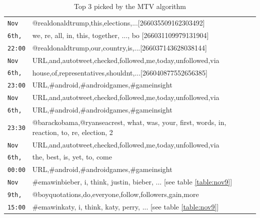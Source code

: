 \documentclass{sig-alternate}
\begin{document}
 
 \begin{table}
 \begin{center}
\small
\def\arraystretch{1.1}
\begin{tabular}{|p{.6cm}|p{7.5cm}|}

\hline

\texttt{Nov}
& @realdonaldtrump,this,elections,...[266035509162303492] \\\cline{2-2} %
\texttt{6th,}
&we, re, all, in, this, together, ..., bo [266031109979131904]  \\\cline{2-2} %
\texttt{22:00} & @realdonaldtrump,our,country,is,...[266037143628038144] \\\hline %




\texttt{Nov}
&URL,and,autotweet,checked,followed,me,today,unfollowed,via \\\cline{2-2}
\texttt{6th,}
&house,of,representatives,shouldnt,...[266040877552656385]  \\\cline{2-2} %
\texttt{23:00} & URL,\#android,\#androidgames,\#gameinsight \\\hline 


\texttt{Nov}
&URL,and,autotweet,checked,followed,me,today,unfollowed,via \\\cline{2-2}
\texttt{6th,}
&URL,\#android,\#androidgames,\#gameinsight  \\\cline{2-2} 
\texttt{23:30} &@barackobama,@ryanseacrest, what, was, your, first, words, in, reaction, to, re, election, 2\\\hline 


\texttt{Nov}
&URL,and,autotweet,checked,followed,me,today,unfollowed,via \\\cline{2-2}
\texttt{6th,}
&the, best, is, yet, to, come \\\cline{2-2} 
\texttt{00:00} & URL,\#android,\#androidgames,\#gameinsight \\\hline 



\texttt{Nov}
& \#emawinbieber, i, think, justin, bieber, ... [see table \ref{table:nov9}] \\\cline{2-2}
\texttt{9th,}
&@boyquotations,do,everyone,follow,followers,gain,more \\\cline{2-2} 
\texttt{15:00} & \#emawinkaty, i, think, katy, perry, ... [see table \ref{table:nov9}] \\\hline 
\end{tabular}
\end{center}
\caption{Top 3 picked by the MTV algorithm}
 \label{table:mtv}
\end{table}
\end{document}
